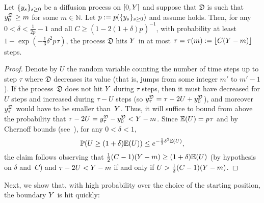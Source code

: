 	\begin{lemma}\label{lem:auxdfrac}
	Let $\{y_s\}_{s\geq 0}$ be a diffusion process on $[0,Y]$ and
	suppose that $\mathfrak{D}$ is such that $y_0^{\mathfrak{D}} \ge m$ for some $m \in \mathbb{N}$. Let $p:=p(\{y_s\}_{s\ge 0})$ and assume  holds. Then, for any $0< \delta <\frac{1}{2p_{}}-1$ and all $C\geq (1-2(1+\delta)p_{})^{-1}$, with probability at least $1-\exp(-\frac13\delta^2p_{}\tau)$, the process
	$\mathfrak{D}$ hits $Y$ in at most $\tau=\tau(m):=\lfloor C(Y-m)\rfloor$ steps.
	\end{lemma}
	\begin{proof}
	Denote by $U$ the random variable counting the number of time steps up to step $\tau$ where $\mathfrak{D}$ decreases its value (that is, jumps from some integer $m'$ to $m'-1$). 
	If the process~$\mathfrak{D}$ does not hit $Y$ during $\tau$ steps, then it 
	must have decreased for $U$ steps and increased during $\tau-U$ steps 
	(so $y^{\mathfrak{D}}_\tau=\tau-2U+y^{\mathfrak{D}}_0$), and moreover $y^{\mathfrak{D}}_\tau$
	would have to be smaller than~$Y$.
	Thus, it will suffice to bound from above the probability that $\tau-2U=y^{\mathfrak{D}}_\tau-y^{\mathfrak{D}}_0< Y-m$.
	Since $\mathbb{E}(U)=p_{}\tau$ and by Chernoff bounds (see~\cite[Theorem 4.4(2)]{mu17}), for any $0 <\delta < 1$,
    \[%
    \PP(U \ge (1+\delta)\EE(U)) \le e^{-\frac13\delta^2\EE(U)},
    \]
    the claim follows observing that $\frac12(C-1)(Y-m)\geq (1+\delta)\mathbb{E}(U)$ (by hypothesis on $\delta$ and~$C$) and $\tau-2U<Y-m$ if and only if $U > \tfrac12(C-1)(Y-m)$.
	\end{proof}

	Next, we show that, with high probability over the choice of the starting position, the boundary $Y$ is hit quickly:


